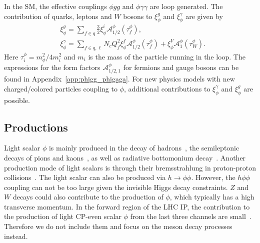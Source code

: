 \documentclass[letterpaper,11pt]{article}
\begin{document}
In the SM, the effective couplings $\phi gg$ and $\phi \gamma\gamma$ are loop generated. The contribution of quarks, leptons and $W$ bosons to $\xi_{\phi}^{g}$ and $\xi_{\phi}^{\gamma}$ are given by \cite{Tanabashi:2018oca,Djouadi:2005gi,Fugel:2004ug} 
\begin{align}
    &\xi^{g}_{\phi}=\sum_{f\in q}\frac{3}{2}\xi^i_\phi \mathcal{A}_{1 / 2}^{\phi}(\tau_f^\phi), 
        \label{eq:coup_hgg}
\\
    &\xi_\phi^\gamma=\sum_{f\in q, \ell} N_{c} Q_{f}^{2} \xi_\phi^{f} \mathcal{A}_{1 / 2}^{\phi}\left(\tau_{f}^\phi\right)+ \xi_\phi^{V} \mathcal{A}_{1}^{\phi}\left(\tau_{W}^\phi\right).  
    \label{eq:coup_hgaga}
\end{align}
 Here $\tau_{i}^\phi=m_{\phi}^{2} / 4 m_{i}^{2}$ and $m_i$ is the mass of the particle running in the loop.  The expressions for the form factors  $\mathcal{A}_{1/2,1}^\phi$ for fermions and gauge bosons can be found in   Appendix~\ref{app:phigg_phigaga}.   
 For new physics models with new charged/colored particles coupling to $\phi$, additional contributions to $\xi^{\gamma}_{\phi}$ and $\xi^{g}_{\phi}$ are possible. 

\subsection{Productions}
\label{sec:cp-even-pro}

Light scalar $\phi$ is mainly produced in the decay of hadrons~\cite{Boiarska:2019jym, Feng:2017vli,Leutwyler:1989xj,Gunion:1989we,Egana-Ugrinovic:2019wzj,Chivukula:1988gp,Grinstein:1988yu}, the semileptonic decays of pions and kaons~\cite{Dawson:1989kr,Feng:2017vli},  as well as radiative bottomonium decay~\cite{Winkler:2018qyg}. Another production mode of light scalars is through their bremsstrahlung in proton-proton collisions~\cite{Boiarska:2019jym}.   The light scalar can also be produced via $h \to \phi\phi$.  However, the $h\phi\phi$ coupling can not be too large given the invisible Higgs decay constraints.     $Z$ and $W$ decays could also contribute to the production of $\phi$, which typically has a high transverse momentum.   In the forward region of the LHC IP, the contribution to the production of light CP-even scalar $\phi$ from the last three channels are small~\cite{Feng:2017vli, Boiarska:2019jym}. Therefore we do not include them and focus on the meson decay processes instead. 
 
\end{document}
